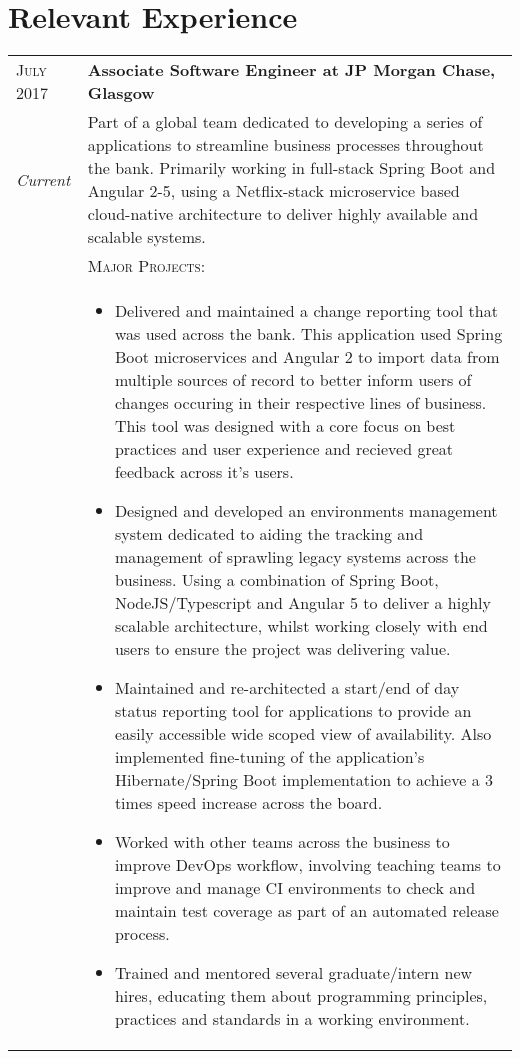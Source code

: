 \section{Relevant Experience}

\begin{tabular}{p{60pt}|p{11cm}}
	\hspace*{\fill}\textsc{July 2017} & \textbf{Associate Software Engineer at JP Morgan Chase, Glasgow} \\
	
	\hspace*{\fill}\emph{Current}& \small{
		Part of a global team dedicated to developing a series of applications to streamline business processes throughout the bank. Primarily working in full-stack Spring Boot and Angular 2-5, using a Netflix-stack microservice based cloud-native architecture to deliver highly available and scalable systems.
	} \\

	\ & \vspace{1pt}\textsc{Major Projects}: \\

	&\vspace{-0.9em}\begin{itemize}[itemsep=0pt,topsep=0pt,leftmargin=*]\small
		\item Delivered and maintained a change reporting tool that was used across the bank. This application used Spring Boot microservices and Angular 2 to import data from multiple sources of record to better inform users of changes occuring in their respective lines of business. This tool was designed with a core focus on best practices and user experience and recieved great feedback across it's users. 
		\end{itemize}
		\begin{itemize}[itemsep=0pt,topsep=0pt,leftmargin=*]\small
		\item Designed and developed an environments management system dedicated to aiding the tracking and management of sprawling legacy systems across the business. Using a combination of Spring Boot, NodeJS/Typescript and Angular 5 to deliver a highly scalable architecture, whilst working closely with end users to ensure the project was delivering value.
		\item Maintained and re-architected a start/end of day status reporting tool for applications to provide an easily accessible wide scoped view of availability. Also implemented fine-tuning of the application's Hibernate/Spring Boot implementation to achieve a 3 times speed increase across the board.
		\item Worked with other teams across the business to improve DevOps workflow, involving teaching teams to improve and manage CI environments to check and maintain test coverage as part of an automated release process.
		\item Trained and mentored several graduate/intern new hires, educating them about programming principles, practices and standards in a working environment.
	\end{itemize}\vspace{-1.8em}


\end{tabular}
